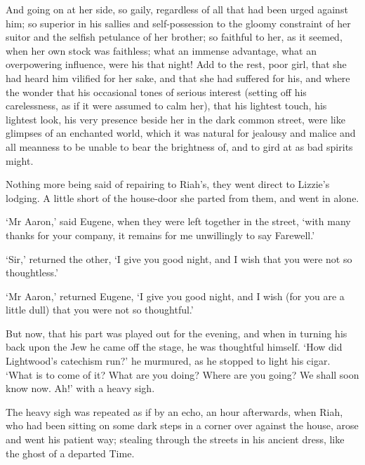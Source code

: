 And going on at her side, so gaily, regardless of all that had been
urged against him; so superior in his sallies and self-possession to
the gloomy constraint of her suitor and the selfish petulance of her
brother; so faithful to her, as it seemed, when her own stock was
faithless; what an immense advantage, what an overpowering influence,
were his that night! Add to the rest, poor girl, that she had heard him
vilified for her sake, and that she had suffered for his, and where the
wonder that his occasional tones of serious interest (setting off his
carelessness, as if it were assumed to calm her), that his lightest
touch, his lightest look, his very presence beside her in the dark
common street, were like glimpses of an enchanted world, which it was
natural for jealousy and malice and all meanness to be unable to bear
the brightness of, and to gird at as bad spirits might.

Nothing more being said of repairing to Riah’s, they went direct to
Lizzie’s lodging. A little short of the house-door she parted from them,
and went in alone.

‘Mr Aaron,’ said Eugene, when they were left together in the street,
‘with many thanks for your company, it remains for me unwillingly to say
Farewell.’

‘Sir,’ returned the other, ‘I give you good night, and I wish that you
were not so thoughtless.’

‘Mr Aaron,’ returned Eugene, ‘I give you good night, and I wish (for you
are a little dull) that you were not so thoughtful.’

But now, that his part was played out for the evening, and when in
turning his back upon the Jew he came off the stage, he was thoughtful
himself. ‘How did Lightwood’s catechism run?’ he murmured, as he stopped
to light his cigar. ‘What is to come of it? What are you doing? Where
are you going? We shall soon know now. Ah!’ with a heavy sigh.

The heavy sigh was repeated as if by an echo, an hour afterwards, when
Riah, who had been sitting on some dark steps in a corner over against
the house, arose and went his patient way; stealing through the streets
in his ancient dress, like the ghost of a departed Time.

